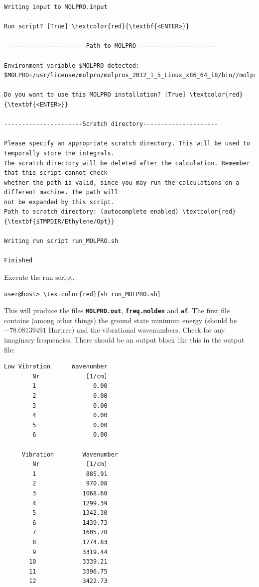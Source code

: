 \documentclass[a4paper,11pt,DIV=15,openany]{scrbook}
\newcommand{\ttt}[1]{\textbf{\texttt{#1}}}
\begin{document}
\begin{oframed}
\begin{Verbatim}[commandchars=\\\{\}]
Writing input to MOLPRO.input

Run script? [True] \textcolor{red}{\textbf{<ENTER>}}

-----------------------Path to MOLPRO-----------------------

Environment variable $MOLPRO detected:
$MOLPRO=/usr/license/molpro/molpros_2012_1_5_Linux_x86_64_i8/bin//molpro

Do you want to use this MOLPRO installation? [True] \textcolor{red}{\textbf{<ENTER>}}

----------------------Scratch directory---------------------

Please specify an appropriate scratch directory. This will be used to temporally store the integrals. 
The scratch directory will be deleted after the calculation. Remember that this script cannot check 
whether the path is valid, since you may run the calculations on a different machine. The path will 
not be expanded by this script.
Path to scratch directory: (autocomplete enabled) \textcolor{red}{\textbf{$TMPDIR/Ethylene/Opt}}

Writing run script run_MOLPRO.sh

Finished
\end{Verbatim}
\end{oframed}

\normalsize

Execute the run script.
\begin{Verbatim}[commandchars=\\\{\}]
user@host> \textcolor{red}{sh run_MOLPRO.sh}
\end{Verbatim}
This will produce the files \ttt{MOLPRO.out}, \ttt{freq.molden} and \ttt{wf}. The first file contains (among other things) the ground state minimum energy (should be $-78.08139491$ Hartree) and the vibrational wavenumbers. Check for any imaginary frequencies. There should be an output block like this in the output file:
\begin{oframed}
\footnotesize\begin{Verbatim}[commandchars=\\\{\}]
   Low Vibration      Wavenumber
        Nr             [1/cm] 
        1                0.00
        2                0.00
        3                0.00
        4                0.00
        5                0.00
        6                0.00

     Vibration        Wavenumber
        Nr             [1/cm] 
        1              885.91
        2              970.08
        3             1068.60
        4             1299.39
        5             1342.30
        6             1439.73
        7             1605.70
        8             1774.83
        9             3319.44
       10             3339.21
       11             3396.75
       12             3422.73
\end{Verbatim}
\end{oframed}
\end{document}

